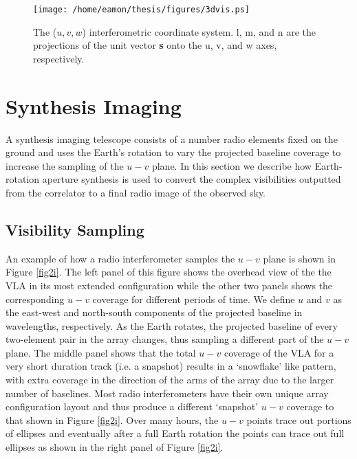 \begin{figure}[hbt!]
\centering 
          \texttt{[image: /home/eamon/thesis/figures/3dvis.ps]}
\caption[The ($u,v,w$) interferometric coordinate system.]{The ($u,v,w$) interferometric coordinate system. l, m, and n are the projections of the unit vector \textbf{s} onto the u, v, and w axes, respectively.}
\label{fig2h}
\end{figure}

\section{Synthesis Imaging}\label{sec:4}
A synthesis imaging telescope consists of a number radio elements fixed on the ground and uses the Earth's rotation to vary the projected baseline coverage to increase the sampling of the $u-v$ plane. In this section we describe how Earth-rotation aperture synthesis is used to convert the complex visibilities outputted from the correlator to a final radio image of the observed sky.
\subsection{Visibility Sampling}\label{subsec:4.1}
An example of how a radio interferometer samples the $u-v$ plane is shown in Figure \ref{fig2i}. The left panel of this figure shows the overhead view of the the VLA in its most extended configuration while the other two panels shows the corresponding $u-v$ coverage for different periods of time. We define $u$ and $v$ as the east-west and north-south components of the projected baseline in wavelengths, respectively. As the Earth rotates, the projected baseline of every two-element pair in the array changes, thus sampling a different part of the $u-v$ plane. The middle panel shows that the total $u-v$ coverage of the VLA for a very short duration track (i.e. a snapshot) results in a `snowflake' like pattern, with extra coverage in the direction of the arms of the array due to the larger number of baselines. Most radio interferometers have their own unique array configuration layout and thus produce a different `snapshot' $u-v$ coverage to that shown in Figure \ref{fig2i}. Over many hours, the $u-v$ points trace out portions of ellipses and eventually after a full Earth rotation the points can trace out full ellipses as shown in the right panel of Figure \ref{fig2i}. 


